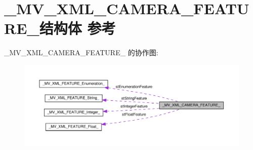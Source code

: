 \hypertarget{struct___m_v___x_m_l___c_a_m_e_r_a___f_e_a_t_u_r_e__}{}\section{\+\_\+\+M\+V\+\_\+\+X\+M\+L\+\_\+\+C\+A\+M\+E\+R\+A\+\_\+\+F\+E\+A\+T\+U\+R\+E\+\_\+结构体 参考}
\label{struct___m_v___x_m_l___c_a_m_e_r_a___f_e_a_t_u_r_e__}


\+\_\+\+M\+V\+\_\+\+X\+M\+L\+\_\+\+C\+A\+M\+E\+R\+A\+\_\+\+F\+E\+A\+T\+U\+R\+E\+\_\+ 的协作图\+:\nopagebreak
\begin{figure}[H]
\begin{center}
\leavevmode
\includegraphics[width=350pt]{struct___m_v___x_m_l___c_a_m_e_r_a___f_e_a_t_u_r_e____coll__graph}
\end{center}
\end{figure}
